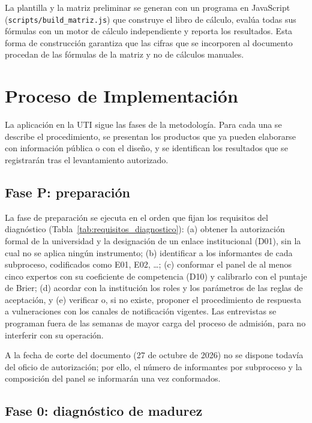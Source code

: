 La plantilla y la matriz preliminar se generan con un programa en JavaScript (\texttt{scripts/build\_matriz.js}) que construye el libro de cálculo, evalúa todas sus fórmulas con un motor de cálculo independiente y reporta los resultados. Esta forma de construcción garantiza que las cifras que se incorporen al documento procedan de las fórmulas de la matriz y no de cálculos manuales.

\section{Proceso de Implementación}

La aplicación en la UTI sigue las fases de la metodología. Para cada una se describe el procedimiento, se presentan los productos que ya pueden elaborarse con información pública o con el diseño, y se identifican los resultados que se registrarán tras el levantamiento autorizado.

\subsection{Fase P: preparación}

La fase de preparación se ejecuta en el orden que fijan los requisitos del diagnóstico (Tabla~\ref{tab:requisitos_diagnostico}): (a) obtener la autorización formal de la universidad y la designación de un enlace institucional (D01), sin la cual no se aplica ningún instrumento; (b) identificar a los informantes de cada subproceso, codificados como E01, E02, \ldots; (c) conformar el panel de al menos cinco expertos con su coeficiente de competencia (D10) y calibrarlo con el puntaje de Brier; (d) acordar con la institución los roles y los parámetros de las reglas de aceptación, y (e) verificar o, si no existe, proponer el procedimiento de respuesta a vulneraciones con los canales de notificación vigentes. Las entrevistas se programan fuera de las semanas de mayor carga del proceso de admisión, para no interferir con su operación.

A la fecha de corte del documento (27 de octubre de 2026) no se dispone todavía del oficio de autorización; por ello, el número de informantes por subproceso y la composición del panel se informarán una vez conformados.

\subsection{Fase 0: diagnóstico de madurez}


